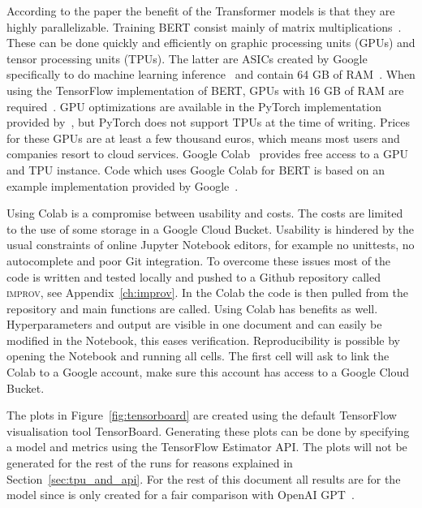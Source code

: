 According to the paper the benefit of the Transformer models is that they are highly parallelizable.
Training BERT consist mainly of matrix multiplications~\citep{dettmers2018}.
These can be done quickly and efficiently on graphic processing units (GPUs) and tensor processing units (TPUs).
The latter are ASICs created by Google specifically to do machine learning inference~\citep{jouppi2017} and contain 64 GB of RAM~\citep{devlin2018github}.
When using the TensorFlow implementation of BERT, GPUs with 16 GB of RAM are required~\citep{devlin2018github}.
GPU optimizations are available in the PyTorch implementation provided by~\citet{wolf2018}, but PyTorch does not support TPUs at the time of writing.
Prices for these GPUs are at least a few thousand euros, which means most users and companies resort to cloud services.
Google Colab~\citet{google2019colab} provides free access to a GPU and TPU instance.
Code which uses Google Colab for BERT is based on an example implementation provided by Google~\citep{bajaj2018}.

Using Colab is a compromise between usability and costs.
The costs are limited to the use of some storage in a Google Cloud Bucket.
Usability is hindered by the usual constraints of online Jupyter Notebook editors, for example no unittests, no autocomplete and poor Git integration.
To overcome these issues most of the code is written and tested locally and pushed to a Github repository called \textsc{improv}, see Appendix~\ref{ch:improv}.
In the Colab the code is then pulled from the repository and main functions are called.
Using Colab has benefits as well.
Hyperparameters and output are visible in one document and can easily be modified in the Notebook, this eases verification.
Reproducibility is possible by opening the Notebook and running all cells.
The first cell will ask to link the Colab to a Google account, make sure this account has access to a Google Cloud Bucket.

The plots in Figure~\ref{fig:tensorboard} are created using the default TensorFlow visualisation tool TensorBoard.
Generating these plots can be done by specifying a model and metrics using the TensorFlow Estimator API.
The plots will not be generated for the rest of the runs for reasons explained in Section~\ref{sec:tpu_and_api}.
For the rest of this document all results are for the  model since  is only created for a fair comparison with OpenAI GPT~\citep{devlin2018}.


